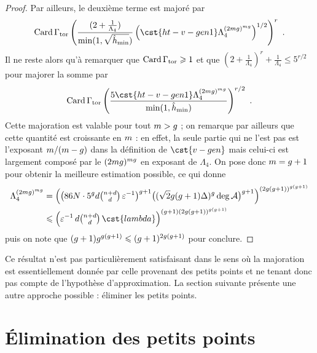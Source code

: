 \begin{proof}
  Par ailleurs, le deuxième terme est majoré par
  \begin{equation}
    \card \Gamma_\torsion
    \left(
      \frac{
        (2 + \frac1{\Lambda_4})
      }{
        \min(1, \sqrt{\hmin})
      }
      \left(
        \cst{ht-v-gen1} \Lambda_4^{(2\puiss\genre)^{\puiss\genre}}
      \right)^{1/2}
    \right)^r
    \pmm.
  \end{equation}
  Il ne reste alors qu'à remarquer que \( \operatorname{Card} \Gamma_{\mathrm{tor}} \geqslant 1 \) et
  que \( (2 + \frac1{\Lambda_4})^r + \frac1{\Lambda_4} \le 5^{r/2} \) pour
  majorer la somme par
  \begin{equation}
    \card \Gamma_\torsion
    \left(
      \frac{
        5 \cst{ht-v-gen1} \Lambda_4^{(2\puiss\genre)^{\puiss\genre}}
      }{
        \min(1, \hmin)
      }
    \right)^{r/2}
    \pmm.
  \end{equation}
  Cette majoration est valable pour tout \( m > g \) ;
  on remarque par ailleurs que cette quantité est croissante en \( m \) :
  en effet, la seule partie qui ne l'est pas est l'exposant \( m /
    (m - g) \) dans la définition de \( \cst{v-gen} \) mais celui-ci
  est largement composé par le \( (2mg)^{mg} \) en
  exposant de \( \Lambda_4 \).  On pose donc \( m = g + 1 \) pour
  obtenir la meilleure estimation possible, ce qui donne
  \begin{align}
    \Lambda_4^{(2\puiss\genre)^{\puiss\genre}}
    & =
    \left(
      \bigl(
        86 \nclmaps \cdot 5^\genre d \sbin{\dimp + d}{d}
        \, \expapx^{-1}
      \bigr)^{ \genre + 1 }
      \bigl( (\sqrt2 \genre(\genre+1)\Delta)^\genre \deg \va \bigr)^{\genre+1}
    \right)^{(2\genre(\genre+1))^{\genre(\genre+1)}}
    \\ & \le
    \Bigl(
      \expapx^{-1}
      \, d \sbin{\dimp + d}{d}
      \, \cst{lambda}
    \Bigr)^{(\genre+1) (2\genre(\genre+1))^{\genre(\genre+1)}}
  \end{align}
  puis on note que
  \(
    (g+1) g^{g(g+1)}
    \leqslant
    (g+1)^{2g(g+1)}
  \) pour conclure.
\end{proof}

Ce résultat n'est pas particulièrement satisfaisant dans le sens où la
majoration est essentiellement donnée par celle provenant des petits points et
ne tenant donc pas compte de l'hypothèse d'approximation. La section suivante
présente une autre approche possible : éliminer les petits points.



\section{Élimination des petits points}
\label{sec:no-small-points}

